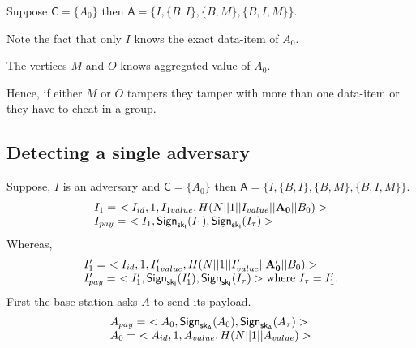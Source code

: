 \documentclass[%
  slidesonly,%
  semlayer%
  ]{seminar}                                  %
\newcommand{\sk}{\sf{sk}}
\begin{document}
\begin{slide}
        Suppose $\textsf{C}=\{A_{0}\}$ then $\textsf{A} =\{I,\{B,I\},\{B,M\},\{B,I,M\}\}$. 

        Note the fact that only $I$ knows the exact data-item of $A_{0}$. 
        
        The vertices $M$ and $O$ knows aggregated value of $A_{0}$. 
        
        Hence, if either $M$ or $O$ tampers they tamper with more than one data-item or they have to cheat in a group. 

      \subsection*{Detecting a single adversary}
        \vfill
        Suppose, $I$ is an adversary and $\textsf{C} = \{A_{0}\}$ then $\textsf{A}=\{I,\{B,I\},\{B,M\},\{B,I,M\}\}$.
        \begin{equation*}
          \begin{array}{l}
            I_{1} =\ <I_{id}, 1, I_{1value}, H(N||1||I_{value}||\mathbf{A_{0}}||B_{0})> \\ 
            I_{pay} =\ <I_{1}, \textsf{Sign}_{\sk_{I}}(I_{1}), \textsf{Sign}_{\sk_{I}}(I_{\tau})>\\
          \end{array}
        \end{equation*}
        Whereas,
        \begin{equation*}
          \begin{array}{l}
            I'_{1} =\ <I_{id}, 1, I'_{1value}, H(N||1||I'_{value}||\mathbf{A'_{0}}||B_{0})> \\
            I'_{pay} =\ <I'_{1}, \textsf{Sign}_{\sk_{I}}(I'_{1}), \textsf{Sign}_{\sk_{I}}(I_{\tau})> \mbox{where}\ I_{\tau} = I'_{1}.\\
          \end{array}
        \end{equation*}
        First the base station asks $A$ to send its payload.
        \begin{equation*}
          \begin{array}{l}
          A_{pay} =\ <A_{0}, \textsf{Sign}_{\sk_{A}}(A_{0}), \textsf{Sign}_{\sk_{A}}(A_{\tau})>\\
          A_{0} =\ <A_{id}, 1, A_{value}, H(N||1||A_{value})>
          \end{array}
        \end{equation*}


\end{slide}
\end{document}
